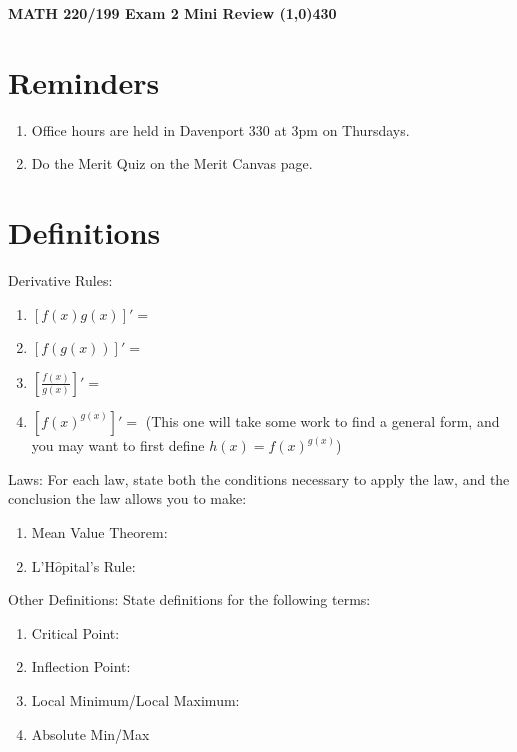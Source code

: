 \documentclass{article}
\begin{document}
\begin{center}
 \LARGE\bfseries MATH 220/199 Exam 2 Mini Review
 \line(1,0){430}
\end{center}
\section*{Reminders}
\begin{enumerate}
    \item Office hours are held in Davenport 330 at 3pm on Thursdays.
    \item Do the Merit Quiz on the Merit Canvas page.
\end{enumerate}
\section*{Definitions}
Derivative Rules:
\begin{enumerate}
    \item $[f(x)g(x)]' = $
    \vfill
    \item $[f(g(x))]' = $
    \vfill
    \item $[\frac{f(x)}{g(x)}]' = $
    \vfill
    \item $[f(x)^{g(x)}]' = $ (This one will take some work to find a general form, and you may want to first define $h(x) = f(x)^{g(x)}$)
    \vfill
\end{enumerate}
Laws: For each law, state both the conditions necessary to apply the law, and the conclusion the law allows you to make:
\begin{enumerate}
    \item Mean Value Theorem:
    \vfill
    \item L'H$\hat{o}$pital's Rule:
    \vfill
\end{enumerate}
Other Definitions: State definitions for the following terms:
\begin{enumerate}
    \item Critical Point:
    \vfill
    \item Inflection Point:
    \vfill
    \item Local Minimum/Local Maximum:
    \vfill
    \item Absolute Min/Max
    \vfill
\end{enumerate}
\newpage
\end{document}

